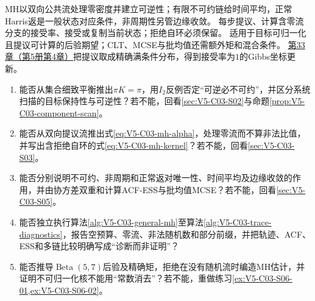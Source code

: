 \begin{SLCompactClosure}
\label{struct:V5-C03-CH36}
{MH以双向公共流处理零密度并建立可逆性；有限不可约链给时间平均，正常Harris返是一般状态对应条件，非周期性另管边缘收敛。}
{每步提议、计算含零流分支的接受率、接受或复制当前状态；拒绝自环必须保留。}
{适用于目标可归一化且提议可计算的后验期望；CLT、MCSE与批均值还需额外矩和混合条件。}
{\hyperref[chap:V5-C04]{第33章（第5册第4章）}把提议取成精确满条件分布，得到接受率为$1$的Gibbs坐标更新。}

\label{struct:V5-C03-CH37}
\begin{selfcheckbox}
\begin{enumerate}[leftmargin=2.2em]
  \item 能否从集合细致平衡推出$\pi K=\pi$，用$I_2$反例否定“可逆必不可约”，并区分系统扫描的目标保持性与可逆性？若不能，回看\cref{sec:V5-C03-S02}与命题\ref{prop:V5-C03-component-scan}。
  \item 能否从双向提议流推出式\eqref{eq:V5-C03-mh-alpha}，处理零流而不算非法比值，并写出含拒绝自环的式\eqref{eq:V5-C03-mh-kernel}？若不能，回看\cref{sec:V5-C03-S03}。
  \item 能否分别说明不可约、非周期和正常返对唯一性、时间平均及边缘收敛的作用，并由协方差双重和计算ACF-ESS与批均值MCSE？若不能，回看\cref{sec:V5-C03-S05}。
  \item 能否独立执行算法\ref{alg:V5-C03-general-mh}至算法\ref{alg:V5-C03-trace-diagnostics}，报告空预算、零流、非法随机数和部分前缀，并把轨迹、ACF、ESS和多链比较明确写成“诊断而非证明”？
  \item 能否推导$\operatorname{Beta}(5,7)$后验及精确矩，拒绝在没有随机流时编造MH估计，并证明不可归一化核不能用“常数消去”？若不能，重做练习\cref{ex:V5-C03-S06-01,ex:V5-C03-S06-02}。
\end{enumerate}
\end{selfcheckbox}
\end{SLCompactClosure}
